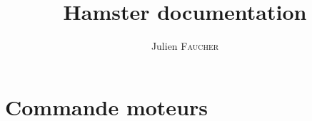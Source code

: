 \documentclass[a4paper,french]{report}
\author{Julien \textsc{Faucher}}
\title{Hamster documentation}
\begin{document}
\maketitle
\tableofcontents 
\listoffigures
\chapter{Commande moteurs}

\end{document}
